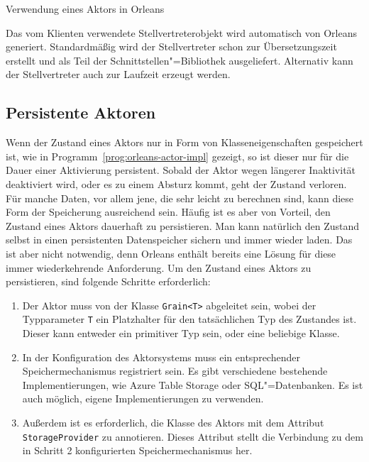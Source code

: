 \begin{program}[!hbt]
\caption{Verwendung eines Aktors in Orleans}
\label{prog:orleans-actor-client}
\end{program}

\iffalse $ \fi

Das vom Klienten verwendete Stellvertreterobjekt wird automatisch von Orleans generiert. Standardmäßig wird der Stellvertreter schon zur Übersetzungszeit erstellt und als Teil der Schnittstellen"=Bibliothek ausgeliefert. Alternativ kann der Stellvertreter auch zur Laufzeit erzeugt werden.

\subsection{Persistente Aktoren}

Wenn der Zustand eines Aktors nur in Form von Klasseneigenschaften gespeichert ist, wie in Programm~\ref{prog:orleans-actor-impl} gezeigt, so ist dieser nur für die Dauer einer Aktivierung persistent. Sobald der Aktor wegen längerer Inaktivität deaktiviert wird, oder es zu einem Absturz kommt, geht der Zustand verloren. Für manche Daten, vor allem jene, die sehr leicht zu berechnen sind, kann diese Form der Speicherung ausreichend sein. Häufig ist es aber von Vorteil, den Zustand eines Aktors dauerhaft zu persistieren. Man kann natürlich den Zustand selbst in einen persistenten Datenspeicher sichern und immer wieder laden. Das ist aber nicht notwendig, denn Orleans enthält bereits eine Lösung für diese immer wiederkehrende Anforderung. Um den Zustand eines Aktors zu persistieren, sind folgende Schritte erforderlich:

\begin{enumerate}
	\item Der Aktor muss von der Klasse \lstinline{Grain<T>} abgeleitet sein, wobei der Typ\-parameter \lstinline{T} ein Platzhalter für den tatsächlichen Typ des Zustandes ist. Dieser kann entweder ein primitiver Typ sein, oder eine beliebige Klasse.
	\item In der Konfiguration des Aktorsystems muss ein entsprechender Speichermechanismus registriert sein. Es gibt verschiedene bestehende Implementierungen, wie \zB Azure Table Storage oder SQL"=Datenbanken. Es ist auch möglich, eigene Implementierungen zu verwenden.
	\item Außerdem ist es erforderlich, die Klasse des Aktors mit dem Attribut \lstinline{StorageProvider} zu annotieren. Dieses Attribut stellt die Verbindung zu dem in Schritt 2 konfigurierten Speichermechanismus her.
\end{enumerate}

